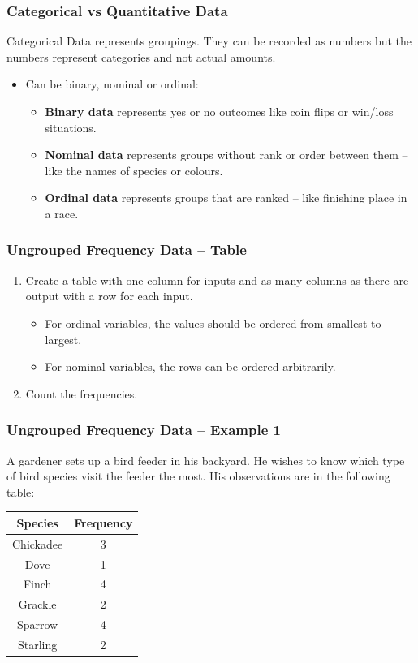 \documentclass[aspectratio=169,11pt,svgnames,handout]{beamer}
\begin{document}
\begin{frame}
 \frametitle{Categorical vs Quantitative Data}
 \alert{Categorical Data} represents groupings. They can be recorded as numbers
 but the numbers represent categories and not actual amounts.
 \pause
 \begin{itemize}[label=\textbullet]
  \item Can be binary, nominal or ordinal:
  \pause
  \begin{itemize}[label=$\circ$]
   \item \textbf{Binary data} represents yes or no outcomes like coin flips or
    win/loss situations.
   \pause
   \item \textbf{Nominal data} represents groups without rank or order between
    them -- like the names of species or colours.
   \pause
   \item \textbf{Ordinal data} represents groups that are ranked -- like
    finishing place in a race.
  \end{itemize}
 \end{itemize}
\end{frame}

\begin{frame}
 \frametitle{Ungrouped Frequency Data -- Table}
 \begin{enumerate}
  \item Create a table with one column for inputs and as many columns as there
   are output with a row for each input.
   \pause
   \begin{itemize}
    \item For \alert{ordinal} variables, the values should be ordered from
     smallest to largest.
    \pause
    \item For \alert{nominal} variables, the rows can be ordered arbitrarily.
   \end{itemize}
  \item Count the \alert{frequencies}.
 \end{enumerate}
\end{frame}

\begin{frame}
 \frametitle{Ungrouped Frequency Data -- Example 1}
 A gardener sets up a bird feeder in his backyard. He wishes to know which type
 of bird species visit the feeder the most.
 \pause
 His observations are in the following table:
 \begin{center}
  \begin{tabular}{c|c}
   \textbf{Species} & \textbf{Frequency}\\
   \toprule
   Chickadee & 3\\
   Dove & 1\\
   Finch & 4\\
   Grackle & 2\\
   Sparrow & 4\\
   Starling & 2
  \end{tabular}
 \end{center}
\end{frame}
\end{document}
